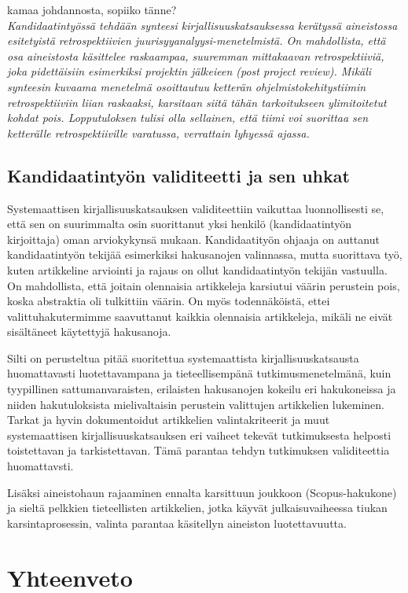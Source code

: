 kamaa johdannosta, sopiiko tänne?\\
\textit{Kandidaatintyössä tehdään synteesi kirjallisuuskatsauksessa kerätyssä aineistossa esitetyistä retrospektiivien juurisyyanalyysi-menetelmistä. On mahdollista, että osa aineistosta käsittelee raskaampaa, suuremman mittakaavan retrospektiiviä, joka pidettäisiin esimerkiksi projektin jälkeieen (post project review). Mikäli synteesin kuvaama menetelmä osoittautuu ketterän ohjelmistokehitystiimin retrospektiiviin liian raskaaksi, karsitaan siitä tähän tarkoitukseen ylimitoitetut kohdat pois. Lopputuloksen tulisi olla sellainen, että tiimi voi suorittaa sen ketterälle retrospektiiville varatussa, verrattain lyhyessä ajassa.}



\subsection{Kandidaatintyön validiteetti ja sen uhkat}
Systemaattisen kirjallisuuskatsauksen validiteettiin vaikuttaa luonnollisesti se, että sen on suurimmalta osin suorittanut yksi henkilö (kandidaatintyön kirjoittaja) oman arviokykynsä mukaan. Kandidaatityön ohjaaja on auttanut kandidaatintyön tekijää esimerkiksi hakusanojen valinnassa, mutta suorittava työ, kuten artikkeline arviointi ja rajaus on ollut kandidaatintyön tekijän vastuulla. On mahdollista, että joitain olennaisia artikkeleja karsiutui väärin perustein pois, koska abstraktia oli tulkittiin väärin. On myös todennäköistä, ettei valittuhakutermimme saavuttanut kaikkia olennaisia artikkeleja, mikäli ne eivät sisältäneet käytettyjä hakusanoja.

Silti on perusteltua pitää suoritettua systemaattista kirjallisuuskatsausta huomattavasti luotettavampana ja tieteellisempänä tutkimusmenetelmänä, kuin tyypillinen sattumanvaraisten, erilaisten hakusanojen kokeilu eri hakukoneissa ja niiden hakutuloksista mielivaltaisin perustein valittujen artikkelien lukeminen. Tarkat ja hyvin dokumentoidut artikkelien valintakriteerit ja muut systemaattisen kirjallisuuskatsauksen eri vaiheet tekevät tutkimuksesta helposti toistettavan ja tarkistettavan. Tämä parantaa tehdyn tutkimuksen validiteettia huomattavsti.

Lisäksi aineistohaun rajaaminen ennalta karsittuun joukkoon (Scopus-hakukone) ja sieltä pelkkien tieteellisten artikkelien, jotka käyvät julkaisuvaiheessa tiukan karsintaprosessin, valinta parantaa käsitellyn aineiston luotettavuutta.

\section{Yhteenveto}
